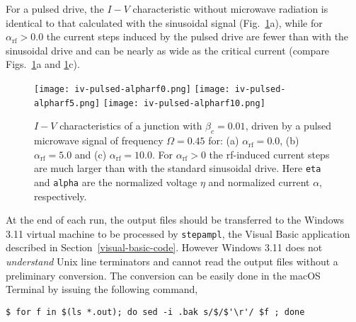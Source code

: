 For a pulsed drive, the $I - V$ characteristic without microwave radiation is identical to that calculated with the sinusoidal signal (Fig.~\ref{fig:iv-pulsed}a), while for $\alpha_\mathrm{rf} > 0.0$ the current steps induced by the pulsed drive are fewer than with the sinusoidal drive and can be nearly as wide as the critical current (compare Figs.~\ref{fig:iv-pulsed}a and \ref{fig:iv-pulsed}c).

\begin{figure}[tb]
{
	\fboxsep=0pt
	\mbox{\texttt{[image: iv-pulsed-alpharf0.png]}}
	\hfill
	\mbox{\texttt{[image: iv-pulsed-alpharf5.png]}}
	\hfill
	\mbox{\texttt{[image: iv-pulsed-alpharf10.png]}}
}
	\caption{$I - V$ characteristics of a junction with $\beta_c = 0.01$, driven by a pulsed microwave signal of frequency $\Omega = 0.45$ for: (a) $\alpha_\mathrm{rf} = 0.0$, (b) $\alpha_\mathrm{rf} = 5.0$ and (c) $\alpha_\mathrm{rf} = 10.0$. For $\alpha_\mathrm{rf} > 0$ the rf-induced current steps are much larger than with the standard sinusoidal drive. Here \texttt{eta} and \texttt{alpha} are the normalized voltage $\eta$ and normalized current $\alpha$, respectively.}
	\label{fig:iv-pulsed}
\end{figure}


At the end of each run, the output files should be transferred to the Windows 3.11 virtual machine to be processed by \texttt{stepampl}, the Visual Basic application described in Section~\ref{visual-basic-code}. However Windows 3.11 does not \emph{understand} Unix line terminators and cannot read the output files without a preliminary conversion. 
The conversion can be easily done in the macOS Terminal by issuing the following command,

\begin{lstlisting}
$ for f in $(ls *.out); do sed -i .bak s/$/$'\r'/ $f ; done
\end{lstlisting}

